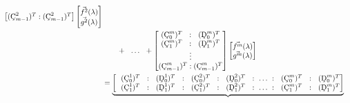 \documentclass[10pt,reqno,oneside,a4paper]{article}
\begin{document}
\begin{align}
\begin{bmatrix}
(\textup{\c{C}}^2_{m-1})^T : (\textup{\c{C}}^2_{m-1})^T 
\end{bmatrix}
\begin{bmatrix}  \vec{f^2}(\lambda) \\ \vec{g^2}(\lambda) \end{bmatrix} \\
&\qquad + \hspace{0.23cm}  \ldots  \hspace{0.23cm} +
\begin{bmatrix} 
(\textup{\c{C}}^m_0)^T \hspace{0.23cm} : \hspace{0.23cm} (\textup{\c{D}}^m_0)^T \\
(\textup{\c{C}}^m_1)^T \hspace{0.23cm} : \hspace{0.23cm} (\textup{\c{D}}^m_1)^T \\
\vdots \\
(\textup{\c{C}}^m_{m-1})^T : (\textup{\c{C}}^m_{m-1})^T 
\end{bmatrix}
\begin{bmatrix}  \vec{f^m}(\lambda) \\ \vec{g^m}(\lambda) \end{bmatrix} \nonumber \\
&=
\underbrace{
\begin{bmatrix}
\hspace{0.23cm} (\textup{\c{C}}^1_0)^T \hspace{0.23cm} : \hspace{0.23cm}  (\textup{\c{D}}^1_0)^T\hspace{0.23cm}  : \hspace{0.23cm}  (\textup{\c{C}}^2_0)^T \hspace{0.23cm}  : \hspace{0.23cm}  (\textup{\c{D}}^2_0)^T \hspace{0.23cm}  :~ \ldots ~: \hspace{0.23cm}  (\textup{\c{C}}^m_0)^T \hspace{0.23cm} : \hspace{0.23cm}  (\textup{\c{D}}^m_0)^T \\
\hspace{0.23cm} (\textup{\c{C}}^1_1)^T \hspace{0.23cm} : \hspace{0.23cm}  (\textup{\c{D}}^1_1)^T\hspace{0.23cm}  : \hspace{0.23cm}  (\textup{\c{C}}^2_1)^T \hspace{0.23cm}  : \hspace{0.23cm}  (\textup{\c{D}}^2_1)^T \hspace{0.23cm}  :~ \ldots ~: \hspace{0.23cm}  (\textup{\c{C}}^m_1)^T \hspace{0.23cm} : \hspace{0.23cm}  (\textup{\c{D}}^m_1)^T \\

\end{bmatrix}}
\end{align}
\end{document}

